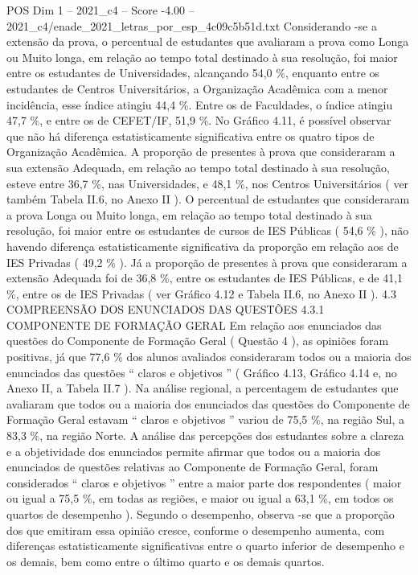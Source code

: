 \begin{textsample}{POS Dim 1 – 2021\_c4 – Score -4.00 – 2021\_c4/enade\_2021\_letras\_por\_esp\_4c09c5b51d.txt}
Considerando -se a extensão da prova, o percentual de estudantes que avaliaram a prova como Longa ou Muito longa, em relação ao tempo total destinado à sua resolução, foi maior entre os estudantes de Universidades, alcançando 54,0 \%, enquanto entre os estudantes de Centros Universitários, a Organização Acadêmica com a menor incidência, esse índice atingiu 44,4 \%.
Entre os de Faculdades, o índice atingiu 47,7 \%, e entre os de CEFET/IF, 51,9 \%.
No Gráfico 4.11, é possível observar que não há diferença estatisticamente significativa entre os quatro tipos de Organização Acadêmica.
A proporção de presentes à prova que consideraram a sua extensão Adequada, em relação ao tempo total destinado à sua resolução, esteve entre 36,7 \%, nas Universidades, e 48,1 \%, nos Centros Universitários ( ver também Tabela II.6, no Anexo II ).
O percentual de estudantes que consideraram a prova Longa ou Muito longa, em relação ao tempo total destinado à sua resolução, foi maior entre os estudantes de cursos de IES Públicas ( 54,6 \% ), não havendo diferença estatisticamente significativa da proporção em relação aos de IES Privadas ( 49,2 \% ).
Já a proporção de presentes à prova que consideraram a extensão Adequada foi de 36,8 \%, entre os estudantes de IES Públicas, e de 41,1 \%, entre os de IES Privadas ( ver Gráfico 4.12 e Tabela II.6, no Anexo II ). 4.3 COMPREENSÃO DOS ENUNCIADOS DAS QUESTÕES 4.3.1 COMPONENTE DE FORMAÇÃO GERAL Em relação aos enunciados das questões do Componente de Formação Geral ( Questão 4 ), as opiniões foram positivas, já que 77,6 \% dos alunos avaliados consideraram todos ou a maioria dos enunciados das questões “ claros e objetivos ” ( Gráfico 4.13, Gráfico 4.14 e, no Anexo II, a Tabela II.7 ).
Na análise regional, a percentagem de estudantes que avaliaram que todos ou a maioria dos enunciados das questões do Componente de Formação Geral estavam “ claros e objetivos ” variou de 75,5 \%, na região Sul, a 83,3 \%, na região Norte.
A análise das percepções dos estudantes sobre a clareza e a objetividade dos enunciados permite afirmar que todos ou a maioria dos enunciados de questões relativas ao Componente de Formação Geral, foram considerados “ claros e objetivos ” entre a maior parte dos respondentes ( maior ou igual a 75,5 \%, em todas as regiões, e maior ou igual a 63,1 \%, em todos os quartos de desempenho ).
Segundo o desempenho, observa -se que a proporção dos que emitiram essa opinião cresce, conforme o desempenho aumenta, com diferenças estatisticamente significativas entre o quarto inferior de desempenho e os demais, bem como entre o último quarto e os demais quartos.

\end{textsample}

